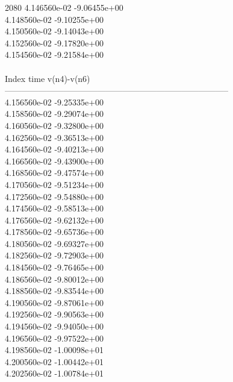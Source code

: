 2080	4.146560e-02	-9.06455e+00	\\ 	4.148560e-02	-9.10255e+00	\\ 	4.150560e-02	-9.14043e+00	\\ 	4.152560e-02	-9.17820e+00	\\ 	4.154560e-02	-9.21584e+00	\\ \hline
\\ \hline
Index   time            v(n4)-v(n6)     \\ \hline
--------------------------------------------------------------------------------\\ 	4.156560e-02	-9.25335e+00	\\ 	4.158560e-02	-9.29074e+00	\\ 	4.160560e-02	-9.32800e+00	\\ 	4.162560e-02	-9.36513e+00	\\ 	4.164560e-02	-9.40213e+00	\\ 	4.166560e-02	-9.43900e+00	\\ 	4.168560e-02	-9.47574e+00	\\ 	4.170560e-02	-9.51234e+00	\\ 	4.172560e-02	-9.54880e+00	\\ 	4.174560e-02	-9.58513e+00	\\ 	4.176560e-02	-9.62132e+00	\\ 	4.178560e-02	-9.65736e+00	\\ 	4.180560e-02	-9.69327e+00	\\ 	4.182560e-02	-9.72903e+00	\\ 	4.184560e-02	-9.76465e+00	\\ 	4.186560e-02	-9.80012e+00	\\ 	4.188560e-02	-9.83544e+00	\\ 	4.190560e-02	-9.87061e+00	\\ 	4.192560e-02	-9.90563e+00	\\ 	4.194560e-02	-9.94050e+00	\\ 	4.196560e-02	-9.97522e+00	\\ 	4.198560e-02	-1.00098e+01	\\ 	4.200560e-02	-1.00442e+01	\\ 	4.202560e-02	-1.00784e+01	\\ \hline

